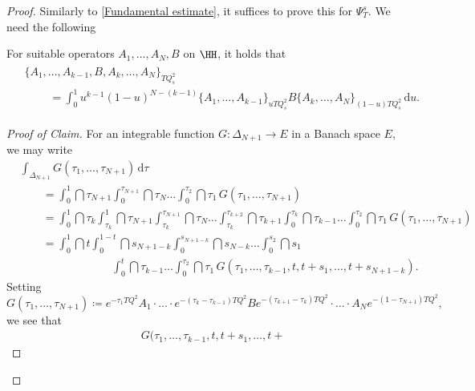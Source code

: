 \documentclass[a4paper, english, 12pt, bibliography=totocnumbered,
index=totoc]{scrartcl}
\begin{document}
\begin{proof}
	Similarly to \cref{Fundamental estimate}, it suffices to prove this for
	$\Psi_T^s$.
	We need the following
	\begin{claim}
		For suitable operators $A_1, \ldots, A_N, B$ on $\HH$, it holds that
		\begin{align}\label{Bracket B}
			\begin{split}
				&\{A_1, \ldots, A_{k-1}, B, A_k, \ldots, A_N\}_{TQ_s^2} \\
				& ~~~~~~~~~~= \int_0^1 u^{k-1}(1-u)^{N-(k-1)}\{A_1, \ldots,
				A_{k-1}\}_{uTQ_s^2} B \{A_k, \ldots, A_N\}_{(1-u)TQ_s^2} \,
				\mathrm{d} u.
			\end{split}
		\end{align}
	\end{claim}
	\begin{proof}[Proof of Claim]
		For an integrable function $G \colon \Delta_{N+1} \to E$ in a Banach
		space $E$, we may write
		\footnotesize
		\begin{align*}
			& \int_{\Delta_{N+1}} G(\tau_1, \ldots, \tau_{N+1}) \, \mathrm{d}
			\tau
			\\
			& \qquad = \int_0^1 \dint \tau_{N+1} \int_0^{\tau_{N+1}} \dint
			\tau_N \ldots \int_0^{\tau_2} \dint \tau_1 \, G(\tau_1, \ldots,
			\tau_{N+1}) \\
			& \qquad = \int_0^1 \dint \tau_k \int_{\tau_k}^1 \dint \tau_{N+1}
			\int_{\tau_k}^{\tau_{N+1}} \dint \tau_N \ldots
			\int_{\tau_k}^{\tau_{k+2}} \dint
			\tau_{k+1} \int_0^{\tau_k} \dint \tau_{k-1} \ldots \int_0^{\tau_2}
			\dint \tau_1 \, G(\tau_1, \ldots, \tau_{N+1}) \\
			& \qquad = \int_0^1 \dint t \int_{0}^{1-t} \dint s_{N+1 - k}
			\int_{0}^{s_{N+1 -k}} \dint s_{N-k} \ldots
			\int_{0}^{s_2} \dint s_1 \\
			& ~~~~~~~~~~~~~~~~~~~~~~~~~~~~~~~~~~~~~ \int_0^{t} \dint
			\tau_{k-1} \ldots \int_0^{\tau_2}
			\dint \tau_1 \, G(\tau_1, \ldots, \tau_{k-1}, t, t+s_1, \ldots, t
			+ s_{N+1 - k}).
		\end{align*}
		\normalsize
		Setting
		\footnotesize
		\begin{equation*}
			G(\tau_1, \ldots, \tau_{N+1}) \coloneqq e^{-\tau_1 TQ^2}A_1 \cdot
			\ldots \cdot e^{-(\tau_k - \tau_{k-1})TQ^2} B
			e^{-(\tau_{k+1} - \tau_k)TQ^2} \cdot \ldots \cdot A_N e^{-(1 -
				\tau_{N+1})TQ^2},
		\end{equation*}
		\normalsize
		we see that
		\begin{align*}
			& G(\tau_1, \ldots, \tau_{k-1}, t, t+s_1, \ldots, t +

\end{align*}
\end{proof}
\end{proof}
\end{document}
